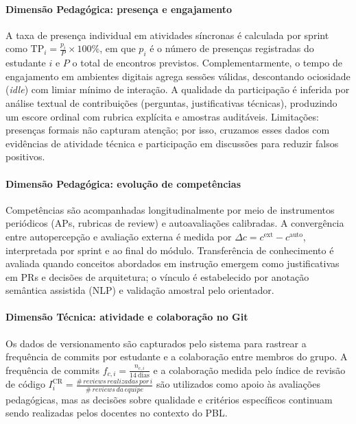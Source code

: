\documentclass[12pt,a4paper]{article}
\begin{document}
\paragraph{Dimensão Pedagógica: presença e engajamento}
A taxa de presença individual em atividades síncronas é calculada por sprint como \(\mathrm{TP}_i = \frac{p_i}{P}\times 100\%\), em que \(p_i\) é o número de presenças registradas do estudante \(i\) e \(P\) o total de encontros previstos. Complementarmente, o tempo de engajamento em ambientes digitais agrega sessões válidas, descontando ociosidade (\textit{idle}) com limiar mínimo de interação. A qualidade da participação é inferida por análise textual de contribuições (perguntas, justificativas técnicas), produzindo um escore ordinal com rubrica explícita e amostras auditáveis. Limitações: presenças formais não capturam atenção; por isso, cruzamos esses dados com evidências de atividade técnica e participação em discussões para reduzir falsos positivos.

\paragraph{Dimensão Pedagógica: evolução de competências}
Competências são acompanhadas longitudinalmente por meio de instrumentos periódicos (APs, rubricas de review) e autoavaliações calibradas. A convergência entre autopercepção e avaliação externa é medida por \(\Delta c = c^{\mathrm{ext}} - c^{\mathrm{auto}}\), interpretada por sprint e ao final do módulo. Transferência de conhecimento é avaliada quando conceitos abordados em instrução emergem como justificativas em PRs e decisões de arquitetura; o vínculo é estabelecido por anotação semântica assistida (NLP) e validação amostral pelo orientador.

\paragraph{Dimensão Técnica: atividade e colaboração no Git}
Os dados de versionamento são capturados pelo sistema para rastrear a frequência de commits por estudante e a colaboração entre membros do grupo. A frequência de commits \(f_{c,i} = \frac{n_{c,i}}{14\ \mathrm{dias}}\) e a colaboração medida pelo índice de revisão de código \(I^{\mathrm{CR}}_i = \frac{\#\,reviews\,realizadas\,por\,i}{\#\,reviews\,da\,equipe}\) são utilizados como apoio às avaliações pedagógicas, mas as decisões sobre qualidade e critérios específicos continuam sendo realizadas pelos docentes no contexto do PBL.
\end{document}
